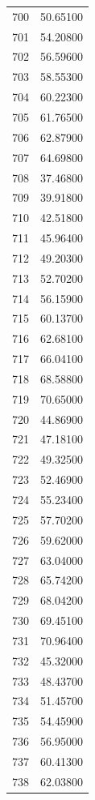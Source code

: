 \documentclass[
  letterpaper,
  DIV=11,
  numbers=noendperiod]{scrreprt}
\begin{document}
\begin{tcolorbox}
\begin{tabular}{lr}
700  &         50.65100 \\
701  &         54.20800 \\
702  &         56.59600 \\
703  &         58.55300 \\
704  &         60.22300 \\
705  &         61.76500 \\
706  &         62.87900 \\
707  &         64.69800 \\
708  &         37.46800 \\
709  &         39.91800 \\
710  &         42.51800 \\
711  &         45.96400 \\
712  &         49.20300 \\
713  &         52.70200 \\
714  &         56.15900 \\
715  &         60.13700 \\
716  &         62.68100 \\
717  &         66.04100 \\
718  &         68.58800 \\
719  &         70.65000 \\
720  &         44.86900 \\
721  &         47.18100 \\
722  &         49.32500 \\
723  &         52.46900 \\
724  &         55.23400 \\
725  &         57.70200 \\
726  &         59.62000 \\
727  &         63.04000 \\
728  &         65.74200 \\
729  &         68.04200 \\
730  &         69.45100 \\
731  &         70.96400 \\
732  &         45.32000 \\
733  &         48.43700 \\
734  &         51.45700 \\
735  &         54.45900 \\
736  &         56.95000 \\
737  &         60.41300 \\
738  &         62.03800 \\

\end{tabular}
\end{tcolorbox}
\end{document}

